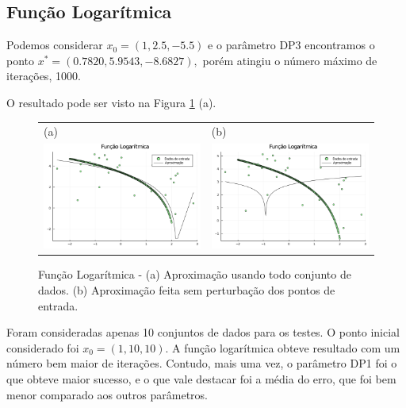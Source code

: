 \documentclass[12pt,a4paper]{article}
\begin{document}
	\subsection{Função Logarítmica} \label{log}
		Podemos considerar $x_0=(1, 2.5, -5.5)$ e o parâmetro DP3 encontramos o ponto $x^*=(0.7820, 5.9543, -8.6827),$ porém atingiu o número máximo de iterações, 1000.
		
		O resultado pode ser visto na Figura \ref{fig3} (a).
	
	\begin{figure}[H]
		\centering 
		\begin{tabular}{ll}
			
			(a)& (b)   \\
			
			\includegraphics[width=0.45\linewidth]{5.png} & \includegraphics[width=0.45\linewidth]{6.png}\\ 
			
		\end{tabular}
		\caption{Função Logarítmica - (a) Aproximação usando todo conjunto de dados. (b) Aproximação feita sem perturbação dos pontos de entrada.}
		\label{fig3}
	\end{figure}
	
	
	Foram consideradas apenas 10 conjuntos de dados para os testes. O ponto inicial considerado foi $x_0 = (1, 10, 10).$ A função logarítmica obteve resultado com um número bem maior de iterações. Contudo, mais uma vez, o parâmetro DP1 foi o que obteve maior sucesso, e o que vale destacar foi a média do erro, que foi bem menor comparado aos outros parâmetros.
	
\end{document}
